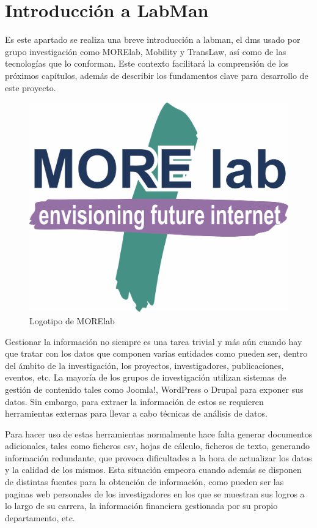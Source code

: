 \section{Introducción a LabMan}

Es este apartado se realiza una breve introducción a \acrfull{labman}, el \acrshort{dms} usado por grupo investigación como MORElab, Mobility y TransLaw, así como de las tecnologías que lo conforman. Este contexto facilitará la comprensión de los próximos capítulos, además de describir los fundamentos clave para desarrollo de este proyecto.

\begin{figure}[!htp]
	\centering
	\includegraphics[scale=0.15]{fig/MORElab-logo}
	\caption{Logotipo de MORElab}
\end{figure}

Gestionar la información no siempre es una tarea trivial y más aún cuando hay que tratar con los datos que componen varias entidades como pueden ser, dentro del ámbito de la investigación, los proyectos, investigadores, publicaciones, eventos, etc. La mayoría de los grupos de investigación utilizan sistemas de gestión de contenido tales como Joomla!\cite{joomla}, WordPress\cite{wordpress} o Drupal\cite{drupal} para exponer sus datos. Sin embargo, para extraer la información de estos  se requieren herramientas externas para llevar a cabo técnicas de análisis de datos. 

Para hacer uso de estas herramientas normalmente hace falta generar documentos adicionales, tales como ficheros \acrfull{csv}, hojas de cálculo, ficheros de texto, generando información redundante, que provoca dificultades a la hora de actualizar los datos y la calidad de los mismos. Esta situación empeora cuando además se disponen de distintas fuentes para la obtención de información, como pueden ser las paginas web personales de los investigadores en los que se muestran sus logros a lo largo de su carrera, la información financiera gestionada por su propio departamento, etc.

